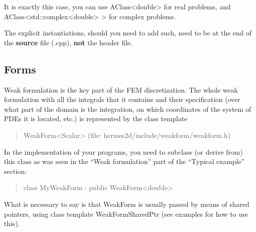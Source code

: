 \documentclass[a4paper,0pt,english]{sphinxmanual}
\begin{document}
It is exactly this case, you can use AClass\textless{}double\textgreater{} for real problems, and AClass\textless{}std::complex\textless{}double\textgreater{} \textgreater{} for complex problems.

The explicit instantiations, should you need to add such, need to be at the end of the \textbf{source} file (.cpp), \textbf{not} the header file.


\subsection{Forms}
\label{src/hermesOO:forms}
Weak formulation is the key part of the FEM discretization.
The whole weak formulation with all the integrals that it contains and their specification (over what part of the domain is the integration, on which coordinates of the system of PDEs it is located, etc.) is represented by the class template
\begin{quote}

WeakForm\textless{}Scalar\textgreater{} (file: hermes2d/include/weakform/weakform.h)
\end{quote}

In the implementation of your programs, you need to subclass (or derive from) this class as was seen in the ``Weak formulation'' part of the ``Typical example'' section:
\begin{quote}

class MyWeakForm : public WeakForm\textless{}double\textgreater{}
\end{quote}

What is necessary to say is that WeakForm is usually passed by means of shared pointers, using class template WeakFormSharedPtr (see examples for how to use this).
\end{document}
